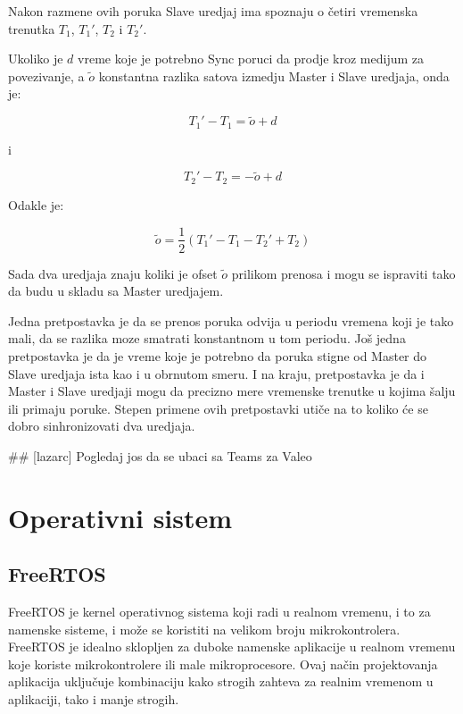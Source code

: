 \documentclass[a4paper,12pt, master]{etf}
\begin{document}
	Nakon razmene ovih poruka Slave uredjaj ima spoznaju o \v{c}etiri vremenska
	trenutka $T_1$,	$T_1'$,	$T_2$ i $T_2'$.

	Ukoliko je $d$ vreme koje je potrebno Sync poruci da prodje kroz medijum za
	povezivanje, a $\tilde{o}$ konstantna razlika satova izmedju Master i Slave
	uredjaja, onda je:

	\begin{equation}
		T_1' - T_1 = \tilde{o} + d
	\end{equation}

	i

	\begin{equation}
			T_2' - T_2 = -\tilde{o} + d
	\end{equation}

	Odakle je:

	\begin{equation}
		\tilde{o} = \frac{1}{2} (T_1' - T_1 - T_2' + T_2)
	\end{equation}

	Sada dva uredjaja znaju koliki je ofset $\tilde{o}$ prilikom prenosa i mogu
	se ispraviti tako da budu u skladu sa Master uredjajem.

	Jedna pretpostavka je da se prenos poruka odvija u periodu vremena koji je
	tako mali, da se razlika moze smatrati konstantnom u tom periodu. Jo\v{s}
	jedna pretpostavka je da je vreme koje je potrebno da poruka stigne od
	Master do Slave uredjaja ista kao i u obrnutom smeru. I na kraju,
	pretpostavka je da i Master i Slave uredjaji mogu da precizno mere
	vremenske trenutke u kojima \v{s}alju ili primaju poruke. Stepen primene
	ovih pretpostavki uti\v{c}e na to koliko \'{c}e se dobro sinhronizovati dva
	uredjaja.

	\#\# [lazarc] Pogledaj jos da se ubaci sa Teams za Valeo

	\newpage

	\chapter{Operativni sistem}

	\section{FreeRTOS}

	FreeRTOS je kernel operativnog sistema koji radi u realnom vremenu, i to za
	namenske sisteme, i mo\v{z}e se koristiti na velikom broju mikrokontrolera.
	FreeRTOS je idealno sklopljen za duboke namenske aplikacije u realnom
	vremenu koje koriste mikrokontrolere ili male mikroprocesore. Ovaj
	na\v{c}in projektovanja aplikacija uklju\v{c}uje kombinaciju kako strogih
	zahteva za realnim vremenom u aplikaciji, tako i manje strogih.
\end{document}
